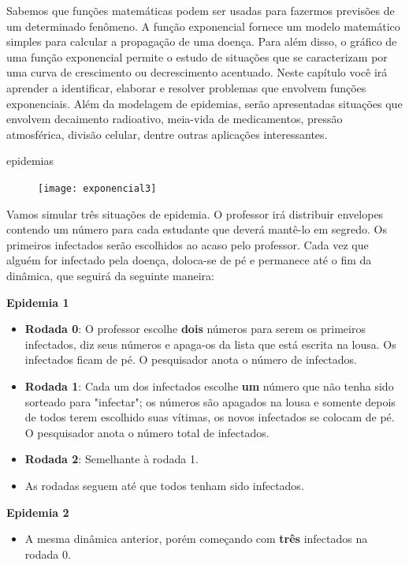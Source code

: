 Sabemos que funções matemáticas podem ser usadas para fazermos previsões de um determinado fenômeno. A função exponencial fornece um modelo matemático simples para calcular a propagação de uma doença. Para além disso, o gráfico de uma função exponencial permite o estudo de situações que se caracterizam por uma curva de crescimento ou decrescimento acentuado. Neste capítulo você irá aprender a identificar, elaborar e resolver problemas que envolvem funções exponenciais. Além da modelagem de epidemias, serão apresentadas situações que envolvem decaimento radioativo, meia-vida de medicamentos, pressão atmosférica, divisão celular, dentre outras aplicações interessantes.

\begin{task}{epidemias}

\begin{figure}[H]
\centering
\texttt{[image: exponencial3]}

\end{figure}

Vamos simular três situações de epidemia. O professor irá distribuir envelopes contendo um número para cada estudante que deverá mantê-lo em segredo. Os primeiros infectados serão escolhidos ao acaso pelo professor. Cada vez que alguém for infectado pela doença, doloca-se de pé e permanece até o fim da dinâmica, que seguirá da seguinte maneira:

\textbf{Epidemia 1}
\begin{itemize}
\item \textbf{Rodada 0}: O professor escolhe \textbf{dois} números para serem os primeiros infectados, diz seus números e apaga-os da lista que está escrita na lousa. Os infectados ficam de pé. O pesquisador anota o número de infectados.
\item\textbf{Rodada 1}: Cada um dos infectados escolhe \textbf{um} número que não tenha sido sorteado para "infectar"; os números são apagados na lousa e somente depois de todos terem escolhido suas vítimas, os novos infectados se colocam de pé. O pesquisador anota o número total de infectados.
\item\textbf{Rodada 2}: Semelhante à rodada 1.
\item As rodadas seguem até que todos tenham sido infectados.
\end{itemize}

\textbf{Epidemia 2}
\begin{itemize}
\item A mesma dinâmica anterior, porém começando com \textbf{três} infectados na rodada 0.
\end{itemize}



\end{task}
